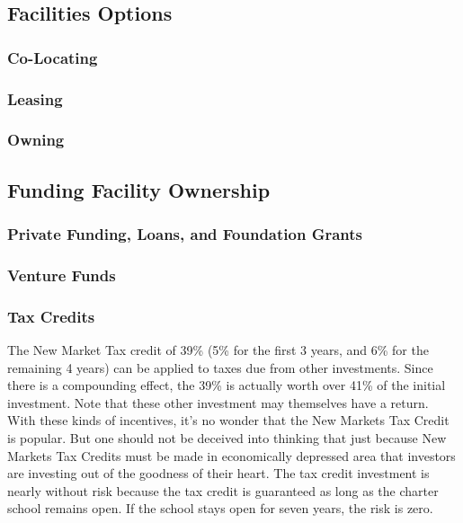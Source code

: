 \subsection{Facilities Options}\label{sec:findings-facilities-options}\indent

\subsubsection{Co-Locating}\label{sec:findings-co-locating}\indent

\subsubsection{Leasing}\label{sec:findings-leasing}\indent

\subsubsection{Owning}\label{sec:findings-owning}\indent

\subsection{Funding Facility Ownership}\label{sec:findings-funding-ownership}\indent

\subsubsection{Private Funding, Loans, and Foundation Grants}\label{sec:findings-private-funding}\indent

\subsubsection{Venture Funds}\label{sec:findings-venture-funds}\indent

\subsubsection{Tax Credits}\label{sec:findings-tax-credits}\indent

The New Market Tax credit of 39\% (5\% for the first 3 years, and 6\% for the remaining 4 years) can be applied to taxes due from other investments. Since there is a compounding effect, the 39\% is actually worth over 41\% of the initial investment. Note that these other investment may themselves have a return. With these kinds of incentives, it's no wonder that the New Markets Tax Credit is popular. But one should not be deceived into thinking that just because New Markets Tax Credits must be made in economically depressed area that investors are investing out of the goodness of their heart. The tax credit investment is nearly without risk because the tax credit is guaranteed as long as the charter school remains open. If the school stays open for seven years, the risk is zero.

